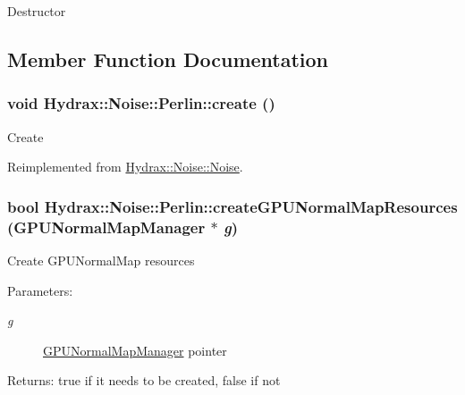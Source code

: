 Destructor 

\subsection{Member Function Documentation}
\hypertarget{class_hydrax_1_1_noise_1_1_perlin_3e260e7c239d90da210aa3e27289c6f0}{
\subsubsection[{create}]{\setlength{\rightskip}{0pt plus 5cm}void Hydrax::Noise::Perlin::create ()}}
\label{class_hydrax_1_1_noise_1_1_perlin_3e260e7c239d90da210aa3e27289c6f0}


Create 

Reimplemented from \hyperlink{class_hydrax_1_1_noise_1_1_noise_be9cf8765feed765e6a35b0779125f6a}{Hydrax::Noise::Noise}.\hypertarget{class_hydrax_1_1_noise_1_1_perlin_db347b98692bd7ce6ad7ce76c605d15a}{
\subsubsection[{createGPUNormalMapResources}]{\setlength{\rightskip}{0pt plus 5cm}bool Hydrax::Noise::Perlin::createGPUNormalMapResources ({\bf GPUNormalMapManager} $\ast$ {\em g})}}
\label{class_hydrax_1_1_noise_1_1_perlin_db347b98692bd7ce6ad7ce76c605d15a}


Create GPUNormalMap resources \begin{Desc}
\item[Parameters:]
\begin{description}
\item[{\em g}]\hyperlink{class_hydrax_1_1_g_p_u_normal_map_manager}{GPUNormalMapManager} pointer \end{description}
\end{Desc}
\begin{Desc}
\item[Returns:]true if it needs to be created, false if not \end{Desc}


